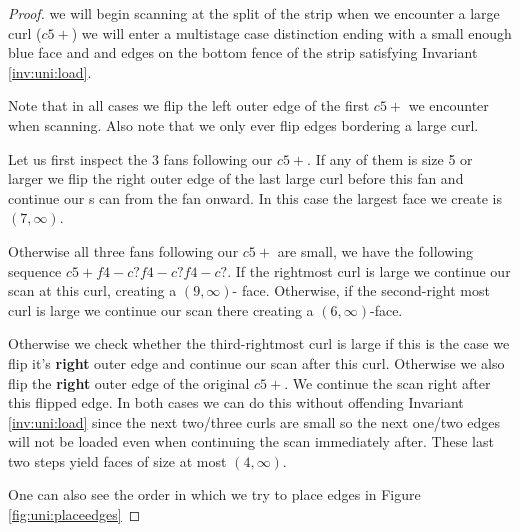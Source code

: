 \begin{proof}
  we will begin scanning at the split of the strip when we encounter a large curl ($c5+$) we  will enter a multistage case distinction ending with a small enough blue face and and edges on the bottom fence of the strip satisfying Invariant \ref{inv:uni:load}.

  Note that in all cases we flip the left outer edge of the first $c5+$ we encounter when scanning. Also note that we only ever flip edges bordering a large curl.


  Let us first inspect the 3 fans following our $c5+$. If any of them is size 5 or larger we flip the right outer edge of the last large curl before this fan and continue our s
can from the fan onward. In this case the largest face we create is $(7, \infty)$.

  Otherwise all three fans following our $c5+$ are small, we have the following sequence $c5+ f4- c? f4- c? f4- c?$. If the rightmost curl is large we continue our scan at this curl, creating a $(9, \infty)$- face. Otherwise, if the second-right most curl is large we continue our scan there creating a $(6, \infty)$-face.

  Otherwise we check whether the third-rightmost curl is large if this is the case we flip it's \textbf{right} outer edge and continue our scan after this curl. Otherwise we also flip the \textbf{right} outer edge of the original $c5+$. We continue the scan right after this flipped edge. In both cases we can do this without offending Invariant \ref{inv:uni:load} since the next two/three curls are small so the next one/two edges will not be loaded even when continuing the scan immediately after. These last two steps yield faces of size at most $(4, \infty)$.

  One can also see the order in which we try to place edges in Figure \ref{fig:uni:placeedges}


\end{proof}
